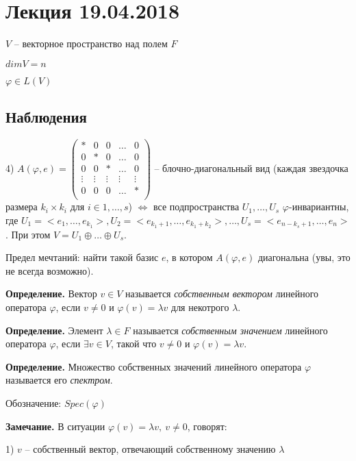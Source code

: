 \section{Лекция 19.04.2018}

$V$ --  векторное пространство над полем $F$

$dim V = n$

$\varphi \in L(V)$

\subsection{Наблюдения}

4) $A(\varphi, e) = \left(
\begin{array}{c|c|c|c|c}
  * & 0 & 0 & \dots & 0  \\
  \hline
  0 & * & 0 & \dots & 0  \\
  \hline
  0 & 0 & * & \dots & 0 \\
  \hline
  \vdots & \vdots & \vdots & \vdots & \vdots \\
  \hline
  0 & 0 & 0 & \dots & * \\
\end{array}
\right)$ -- блочно-диагональный вид (каждая звездочка размера $k_i \times k_i$ для $i \in 1, \dots, s$) $\Leftrightarrow$ все подпространства $U_1, \dots, U_s$ $\varphi$-инвариантны, где $U_1 = <e_1, \dots, e_{k_1}>, U_2 = <e_{k_1 + 1}, \dots, e_{k_1 + k_2}>, \dots, U_s = <e_{n-k_s+1}, \dots, e_n>$. При этом $V = U_1 \oplus \dots \oplus U_s$.

Предел мечтаний: найти такой базис $e$, в котором $A(\varphi, e)$ диагональна (увы, это не всегда возможно).

\bigskip
\textbf{Определение.} Вектор $v \in V$ называется \textit{собственным вектором} линейного оператора $\varphi$, если $v \neq 0$ и $\varphi(v) = \lambda v$ для некотрого $\lambda$. 

\bigskip
\textbf{Определение.} Элемент $\lambda \in F$ называется \textit{собственным значением} линейного оператора $\varphi$, если $\exists v \in V$, такой что $v \neq 0$ и $\varphi(v) = \lambda v$.

\bigskip
\textbf{Определение.} Множество собственных значений линейного оператора $\varphi$ называется его \textit{спектром}.

Обозначение: $Spec(\varphi)$

\bigskip
\textbf{Замечание.} В ситуации $\varphi(v) = \lambda v, \ v \neq 0$, говорят:

1) $v$ -- собственный вектор, отвечающий собственному значению $\lambda$

